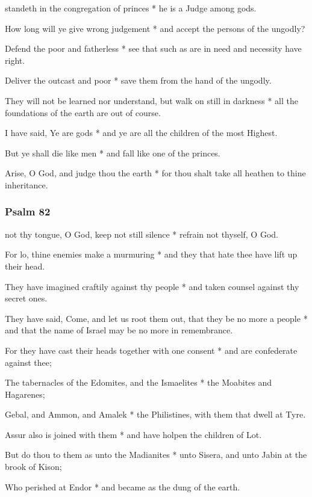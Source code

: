  standeth in the congregation of princes * he is a Judge among gods.

How long will ye give wrong judgement * and accept the persons of the ungodly?

Defend the poor and fatherless * see that such as are in need and necessity have right.

Deliver the outcast and poor * save them from the hand of the ungodly.

They will not be learned nor understand, but walk on still in darkness * all the foundations of the earth are out of course.

I have said, Ye are gods * and ye are all the children of the most Highest.

But ye shall die like men * and fall like one of the princes.

Arise, O God, and judge thou the earth * for thou shalt take all heathen to thine inheritance.

\subsubsection{Psalm 82}


 not thy tongue, O God, keep not still silence * refrain not thyself, O God.

For lo, thine enemies make a murmuring * and they that hate thee have lift up their head.

They have imagined craftily against thy people * and taken counsel against thy secret ones.

They have said, Come, and let us root them out, that they be no more a people * and that the name of Israel may be no more in remembrance.

For they have cast their heads together with one consent * and are confederate against thee;

The tabernacles of the Edomites, and the Ismaelites * the Moabites and Hagarenes;

Gebal, and Ammon, and Amalek * the Philistines, with them that dwell at Tyre.

Assur also is joined with them * and have holpen the children of Lot.

But do thou to them as unto the Madianites * unto Sisera, and unto Jabin at the brook of Kison;

Who perished at Endor * and became as the dung of the earth.

